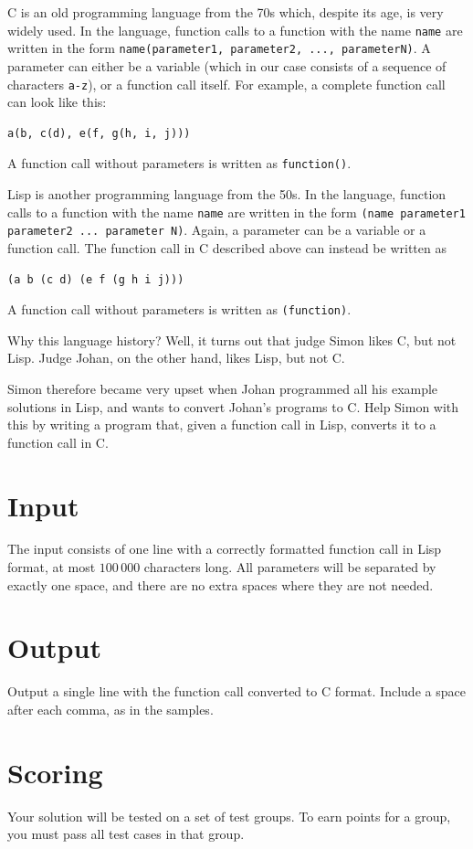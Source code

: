 C is an old programming language from the 70s which, despite its age, is very widely used.
In the language, function calls to a function with the name \texttt{name} are written in the form \texttt{name(parameter1, parameter2, ..., parameterN)}.
A parameter can either be a variable (which in our case consists of a sequence of characters \texttt{a-z}), or a function call itself.
For example, a complete function call can look like this:
\begin{verbatim}
a(b, c(d), e(f, g(h, i, j)))
\end{verbatim}
A function call without parameters is written as \texttt{function()}.

Lisp is another programming language from the 50s.
In the language, function calls to a function with the name \texttt{name} are written in the form \texttt{(name parameter1 parameter2 ... parameter N)}.
Again, a parameter can be a variable or a function call.
The function call in C described above can instead be written as
\begin{verbatim}
(a b (c d) (e f (g h i j)))
\end{verbatim}
A function call without parameters is written as \texttt{(function)}.

Why this language history?
Well, it turns out that judge Simon likes C, but not Lisp.
Judge Johan, on the other hand, likes Lisp, but not C.

Simon therefore became very upset when Johan programmed all his example solutions in Lisp, and wants to convert Johan's programs to C.
Help Simon with this by writing a program that, given a function call in Lisp, converts it to a function call in C.

\section*{Input}
The input consists of one line with a correctly formatted function call in Lisp format, at most $100\,000$ characters long.
All parameters will be separated by exactly one space, and there are no extra spaces where they are not needed.

\section*{Output}
Output a single line with the function call converted to C format.
Include a space after each comma, as in the samples.

\section*{Scoring}
Your solution will be tested on a set of test groups. To earn points for a group, you must pass all test cases in that group.


